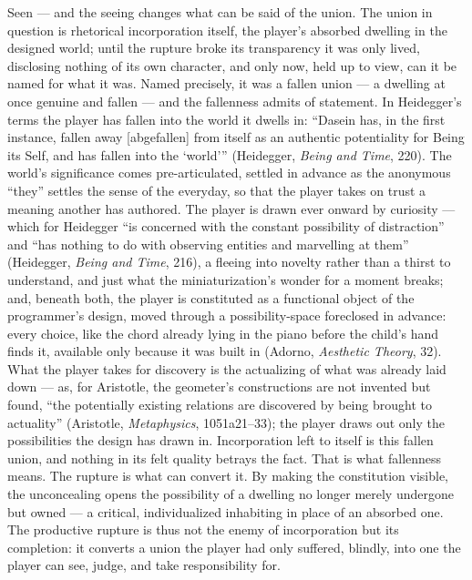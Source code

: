 \documentclass{article}
\begin{document}
Seen — and the seeing changes what can be said of the union. The union in question is rhetorical incorporation itself, the player's absorbed dwelling in the designed world; until the rupture broke its transparency it was only lived, disclosing nothing of its own character, and only now, held up to view, can it be named for what it was. Named precisely, it was a fallen union — a dwelling at once genuine and fallen — and the fallenness admits of statement. In Heidegger's terms the player has fallen into the world it dwells in: ``Dasein has, in the first instance, fallen away [abgefallen] from itself as an authentic potentiality for Being its Self, and has fallen into the `world''' (Heidegger, \textit{Being and Time}, 220). The world's significance comes pre-articulated, settled in advance as the anonymous ``they'' settles the sense of the everyday, so that the player takes on trust a meaning another has authored. The player is drawn ever onward by curiosity — which for Heidegger ``is concerned with the constant possibility of distraction'' and ``has nothing to do with observing entities and marvelling at them'' (Heidegger, \textit{Being and Time}, 216), a fleeing into novelty rather than a thirst to understand, and just what the miniaturization's wonder for a moment breaks; and, beneath both, the player is constituted as a functional object of the programmer's design, moved through a possibility-space foreclosed in advance: every choice, like the chord already lying in the piano before the child's hand finds it, available only because it was built in (Adorno, \textit{Aesthetic Theory}, 32). What the player takes for discovery is the actualizing of what was already laid down — as, for Aristotle, the geometer's constructions are not invented but found, ``the potentially existing relations are discovered by being brought to actuality'' (Aristotle, \textit{Metaphysics}, 1051a21--33); the player draws out only the possibilities the design has drawn in. Incorporation left to itself is this fallen union, and nothing in its felt quality betrays the fact. That is what fallenness means. The rupture is what can convert it. By making the constitution visible, the unconcealing opens the possibility of a dwelling no longer merely undergone but owned — a critical, individualized inhabiting in place of an absorbed one. The productive rupture is thus not the enemy of incorporation but its completion: it converts a union the player had only suffered, blindly, into one the player can see, judge, and take responsibility for.
\end{document}
